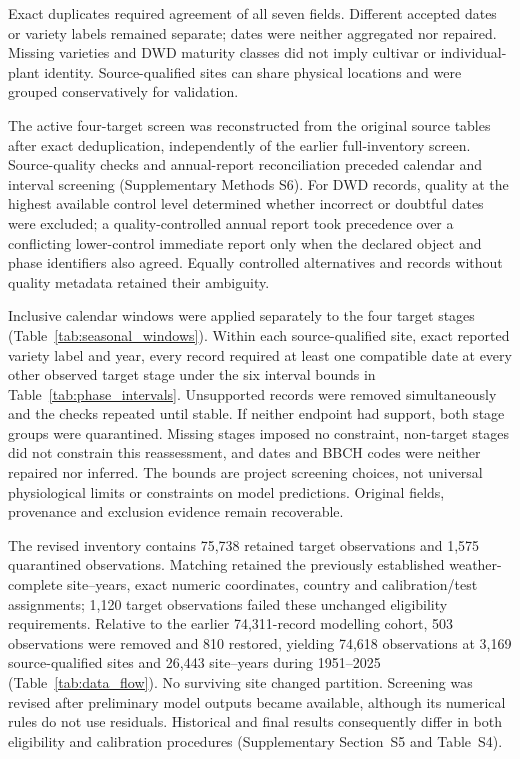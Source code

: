 \documentclass[a4paper,12pt]{article}
\begin{document}
Exact duplicates required agreement of all seven fields. Different accepted
dates or variety labels remained separate; dates were neither aggregated nor
repaired. Missing varieties and DWD maturity classes did not imply cultivar
or individual-plant identity. Source-qualified sites can share physical
locations and were grouped conservatively for validation.

The active four-target screen was reconstructed from the original source tables after exact deduplication, independently of the earlier full-inventory screen. Source-quality checks and annual-report reconciliation preceded calendar and interval screening (Supplementary Methods S6). For DWD records, quality at the highest available control level determined whether incorrect or doubtful dates were excluded; a quality-controlled annual report took precedence over a conflicting lower-control immediate report only when the declared object and phase identifiers also agreed. Equally controlled alternatives and records without quality metadata retained their ambiguity.

Inclusive calendar windows were applied separately to the four target stages (Table~\ref{tab:seasonal_windows}). Within each source-qualified site, exact reported variety label and year, every record required at least one compatible date at every other observed target stage under the six interval bounds in Table~\ref{tab:phase_intervals}. Unsupported records were removed simultaneously and the checks repeated until stable. If neither endpoint had support, both stage groups were quarantined. Missing stages imposed no constraint, non-target stages did not constrain this reassessment, and dates and BBCH codes were neither repaired nor inferred. The bounds are project screening choices, not universal physiological limits or constraints on model predictions. Original fields, provenance and exclusion evidence remain recoverable.

The revised inventory contains 75,738 retained target observations and 1,575 quarantined observations. Matching retained the previously established weather-complete site--years, exact numeric coordinates, country and calibration/test assignments; 1,120 target observations failed these unchanged eligibility requirements. Relative to the earlier 74,311-record modelling cohort, 503 observations were removed and 810 restored, yielding 74,618 observations at 3,169 source-qualified sites and 26,443 site--years during 1951--2025 (Table~\ref{tab:data_flow}). No surviving site changed partition. Screening was revised after preliminary model outputs became available, although its numerical rules do not use residuals. Historical and final results consequently differ in both eligibility and calibration procedures (Supplementary Section~S5 and Table~S4).
\end{document}
